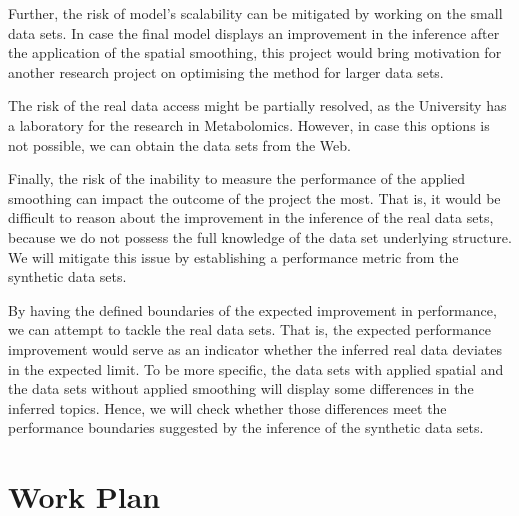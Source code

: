 \documentclass{mprop}
\begin{document}
\par Further, the risk of model's scalability can be mitigated by  working on the small data sets. In case the final model displays an improvement in the inference after the application of the spatial smoothing, this project would bring motivation for another research project on optimising the method for larger data sets. 

\par The risk of the real data access might be partially resolved, as the University has a laboratory for the research in Metabolomics. However, in case this options is not possible, we can obtain the data sets from the Web. 

\par Finally, the risk of the inability to measure the performance of the applied smoothing can impact the outcome of the project the most. That is, it would be difficult to reason about the improvement in the inference of the real data sets, because we do not possess the full knowledge of the data set underlying structure. We will mitigate this issue by establishing a performance metric from the synthetic data sets. 

\par By having the defined boundaries of the expected improvement in performance, we can attempt to tackle the real data sets. That is, the expected performance improvement would serve as an indicator whether the inferred real data deviates in the expected limit. To be more specific, the data sets with applied spatial and the data sets without applied smoothing will display some differences in the inferred topics. Hence, we will check whether those differences meet the performance boundaries suggested by the inference of the synthetic data sets. 


\section{Work Plan}
\end{document}
